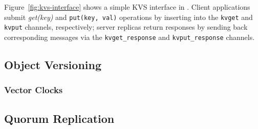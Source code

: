 Figure~\ref{fig:kvs-interface} shows a simple KVS interface in \lang. Client
applications submit \emph{get(key)} and \texttt{put(key, val)} operations by
inserting into the \texttt{kvget} and \texttt{kvput} channels, respectively;
server replicas return responses by sending back corresponding messages via the
\texttt{kvget\_response} and \texttt{kvput\_response} channels.

\subsection{Object Versioning}

\subsubsection{Vector Clocks}

\subsection{Quorum Replication}
